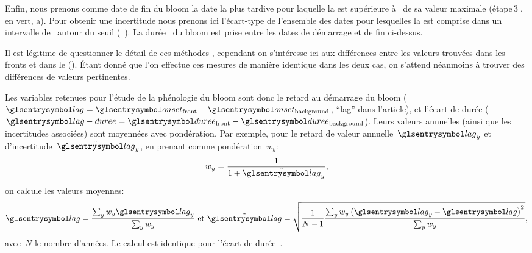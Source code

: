 \begin{figure}
  \centering
  \label{fig:bloom-lag}
\end{figure}

Enfin, nous prenons comme date de fin du bloom la date la plus tardive pour laquelle la  est supérieure à~ de sa valeur maximale (étape\,\textcircled{3}, en vert, a).
Pour obtenir une incertitude nous prenons ici l'écart-type de l'ensemble des dates pour lesquelles la  est comprise dans un intervalle de~ autour du seuil (~).
La durée~ du bloom est prise entre les dates de démarrage et de fin ci-dessus.

Il est légitime de questionner le détail de ces méthodes , cependant on s'intéresse ici aux différences entre les valeurs trouvées dans les fronts et dans le  ().
Étant donné que l'on effectue ces mesures de manière identique dans les deux cas, on s'attend néanmoins à trouver des différences de valeurs pertinentes.

Les variables retenues pour l'étude de la phénologie du bloom sont donc le retard au démarrage du bloom (\(\am{lag} = \am{onset}_\frt - \am{onset}_\bkg \), \enquote{lag} dans l'article), et l'écart de durée (\(\am{lag-duree} = \am{duree}_\frt - \am{duree}_\bkg\)).
Leurs valeurs annuelles (ainsi que les incertitudes associées) sont moyennées avec pondération.
Par exemple, pour le retard de valeur annuelle~\(\am{lag}_y\) et d'incertitude~\(\err{\am{lag}}_y\), en prenant comme pondération~\(w_y\):
\begin{equation}
  w_y = \frac 1 {1 + \err{\am{lag}}_y} ,
\end{equation}
on calcule les valeurs moyennes:
\begin{equation}
  \am{lag} = \frac {\sum_y w_y \am{lag}_y} {\sum_y w_y}
  \text{ et }
  \err{\am{lag}} = \sqrt{ \frac1{N-1} \frac {\sum_y w_y \paren{\am{lag}_y - \am{lag}}^2 } {\sum_y w_y} },
\end{equation}
avec~\(N\) le nombre d'années.
Le calcul est identique pour l'écart de durée~.

{
  \clearpage%
  \vfill
  \vfill
  \clearpage%
}
